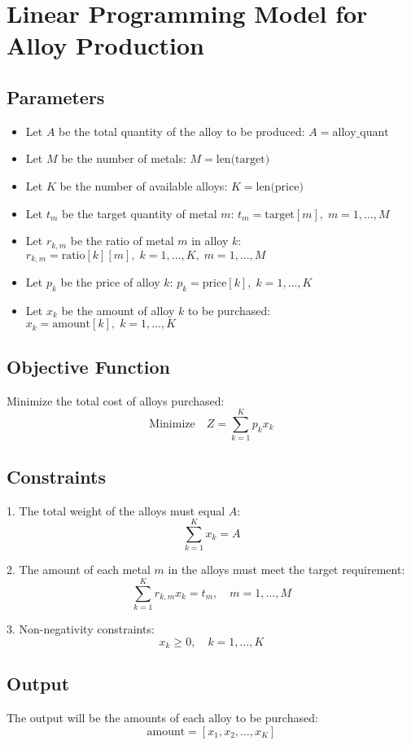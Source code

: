 \documentclass{article}
\begin{document}
\section*{Linear Programming Model for Alloy Production}

\subsection*{Parameters}
\begin{itemize}
    \item Let \( A \) be the total quantity of the alloy to be produced: \( A = \text{alloy\_quant} \)
    \item Let \( M \) be the number of metals: \( M = \text{len(target)} \)
    \item Let \( K \) be the number of available alloys: \( K = \text{len(price)} \)
    \item Let \( t_m \) be the target quantity of metal \( m \): \( t_m = \text{target}[m], \; m = 1, \ldots, M \)
    \item Let \( r_{k, m} \) be the ratio of metal \( m \) in alloy \( k \): \( r_{k, m} = \text{ratio}[k][m], \; k = 1, \ldots, K, \; m = 1, \ldots, M \)
    \item Let \( p_k \) be the price of alloy \( k \): \( p_k = \text{price}[k], \; k = 1, \ldots, K \)
    \item Let \( x_k \) be the amount of alloy \( k \) to be purchased: \( x_k = \text{amount}[k], \; k = 1, \ldots, K \)
\end{itemize}

\subsection*{Objective Function}
Minimize the total cost of alloys purchased:
\[
\text{Minimize} \quad Z = \sum_{k=1}^{K} p_k x_k
\]

\subsection*{Constraints}
1. The total weight of the alloys must equal \( A \):
\[
\sum_{k=1}^{K} x_k = A
\]

2. The amount of each metal \( m \) in the alloys must meet the target requirement:
\[
\sum_{k=1}^{K} r_{k, m} x_k = t_m, \quad m = 1, \ldots, M
\]

3. Non-negativity constraints:
\[
x_k \geq 0, \quad k = 1, \ldots, K
\]

\subsection*{Output}
The output will be the amounts of each alloy to be purchased:
\[
\text{amount} = [x_1, x_2, \ldots, x_K]
\]
\end{document}
